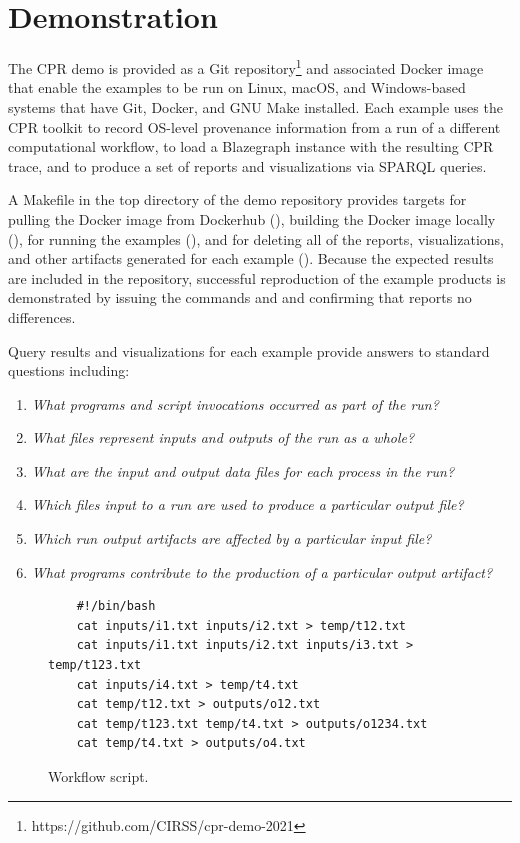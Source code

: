 \section{Demonstration}

The CPR demo is provided as a Git repository\footnote{https://github.com/CIRSS/cpr-demo-2021} and associated Docker image that enable the examples to be run on Linux, macOS, and Windows-based systems that have Git, Docker, and GNU Make installed. Each example uses the CPR toolkit to record OS-level provenance information from a run of a different computational workflow, to load a Blazegraph instance with the resulting CPR trace, and to produce a set of reports and visualizations via SPARQL queries.
 
A Makefile in the top directory of the demo repository provides targets for pulling the Docker image from Dockerhub (), building the Docker image locally (), for running the examples (), and for deleting all of the reports, visualizations, and other artifacts generated for each example (). Because the expected results are included in the repository, successful reproduction of the example products is demonstrated by issuing the commands  and  and confirming that  reports no differences.

Query results and visualizations for each example provide answers to standard questions including:
\begin{enumerate}
\item \emph{What programs and script invocations occurred as part of the run?}
\item \emph{What files represent inputs and outputs of the run as a whole?}
\item \emph{What are the input and output data files for each process in the run?}
\item \emph{Which files input to a run are used to produce a particular output file?}
\item \emph{Which run output artifacts are affected by a particular input file?}
\item \emph{What programs contribute to the production of a particular output artifact?}
\end{enumerate}

\begin{figure}[t]
\begin{verbatim}
    #!/bin/bash
    cat inputs/i1.txt inputs/i2.txt > temp/t12.txt
    cat inputs/i1.txt inputs/i2.txt inputs/i3.txt > temp/t123.txt
    cat inputs/i4.txt > temp/t4.txt
    cat temp/t12.txt > outputs/o12.txt
    cat temp/t123.txt temp/t4.txt > outputs/o1234.txt
    cat temp/t4.txt > outputs/o4.txt
\end{verbatim}
\vspace*{-1.5em}  %
        \caption{Workflow script.}
        \label{fig-script}
      \end{figure}

